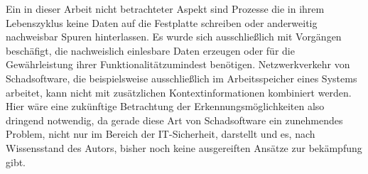 Ein in dieser Arbeit nicht betrachteter Aspekt sind Prozesse die in ihrem Lebenszyklus keine Daten auf die Festplatte schreiben oder anderweitig nachweisbar Spuren hinterlassen. Es wurde sich ausschließlich mit Vorgängen beschäfigt, die nachweislich einlesbare Daten erzeugen oder für die Gewährleistung ihrer Funktionalitätzumindest benötigen. Netzwerkverkehr von Schadsoftware, die beispielsweise ausschließlich im Arbeitsspeicher eines Systems arbeitet, kann nicht mit zusätzlichen Kontextinformationen kombiniert werden. Hier wäre eine zukünftige Betrachtung der Erkennungsmöglichkeiten also dringend notwendig, da gerade diese Art von Schadsoftware ein zunehmendes Problem, nicht nur im Bereich der IT-Sicherheit, darstellt und es, nach Wissensstand des Autors, bisher noch keine ausgereiften Ansätze zur bekämpfung gibt.
